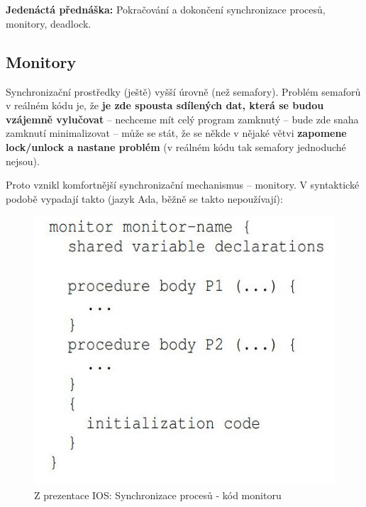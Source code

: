 \documentclass[a4paper, 11pt]{article}
\begin{document}
\clearpage
\section{}
\textbf{Jedenáctá přednáška:} Pokračování a dokončení synchronizace procesů, monitory, deadlock.
 
\subsection{Monitory}
Synchronizační prostředky (ještě) vyšší úrovně (než semafory). Problém semaforů v reálném kódu je, že \textbf{je zde spousta sdílených dat, která se budou vzájemně vylučovat} -- nechceme mít celý program zamknutý -- bude zde snaha zamknutí minimalizovat -- může se stát, že se někde v nějaké větvi \textbf{zapomene lock/unlock a nastane problém} (v reálném kódu tak semafory jednoduché nejsou).
 
Proto vznikl komfortnější synchronizační mechanismus -- monitory. V syntaktické podobě vypadají takto (jazyk Ada, běžně se takto nepoužívají):
 
\begin{figure}[ht]
    \centering
    \includegraphics[scale=2]{11.1_1.jpg}
    \caption{Z prezentace IOS: Synchronizace procesů - kód monitoru}
\end{figure}
 
\end{document}
